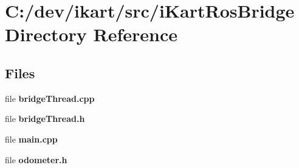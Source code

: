 \section{C\+:/dev/ikart/src/i\+Kart\+Ros\+Bridge Directory Reference}
\label{dir_a0e55278d74a697a561daad0a0dec219}
\subsection*{Files}
\begin{DoxyCompactItemize}
\item 
file {\bfseries bridge\+Thread.\+cpp}
\item 
file {\bfseries bridge\+Thread.\+h}
\item 
file {\bfseries main.\+cpp}
\item 
file {\bfseries odometer.\+h}
\end{DoxyCompactItemize}
